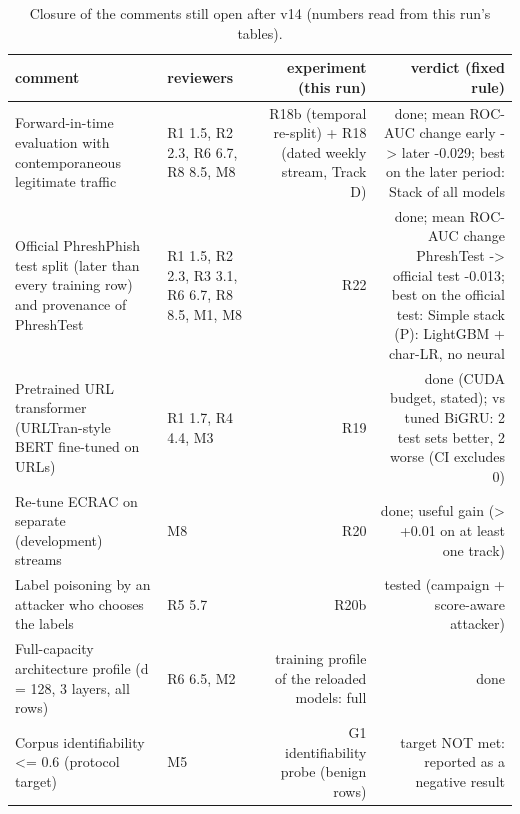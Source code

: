 \begin{table}[t]
\centering
\scriptsize
\caption{Closure of the comments still open after v14 (numbers read from this run's tables).}
\label{tab:rev_R21_reviewer_comment_closure}
\begin{tabular}{llrr}
\toprule
comment & reviewers & experiment (this run) & verdict (fixed rule) \\
\midrule
Forward-in-time evaluation with contemporaneous legitimate traffic & R1 1.5, R2 2.3, R6 6.7, R8 8.5, M8 & R18b (temporal re-split) + R18 (dated weekly stream, Track D) & done; mean ROC-AUC change early -> later -0.029; best on the later period: Stack of all models \\
Official PhreshPhish test split (later than every training row) and provenance of PhreshTest & R1 1.5, R2 2.3, R3 3.1, R6 6.7, R8 8.5, M1, M8 & R22 & done; mean ROC-AUC change PhreshTest -> official test -0.013; best on the official test: Simple stack (P): LightGBM + char-LR, no neural \\
Pretrained URL transformer (URLTran-style BERT fine-tuned on URLs) & R1 1.7, R4 4.4, M3 & R19 & done (CUDA budget, stated); vs tuned BiGRU: 2 test sets better, 2 worse (CI excludes 0) \\
Re-tune ECRAC on separate (development) streams & M8 & R20 & done; useful gain (> +0.01 on at least one track) \\
Label poisoning by an attacker who chooses the labels & R5 5.7 & R20b & tested (campaign + score-aware attacker) \\
Full-capacity architecture profile (d = 128, 3 layers, all rows) & R6 6.5, M2 & training profile of the reloaded models: full & done \\
Corpus identifiability <= 0.6 (protocol target) & M5 & G1 identifiability probe (benign rows) & target NOT met: reported as a negative result \\
\bottomrule
\end{tabular}
\end{table}